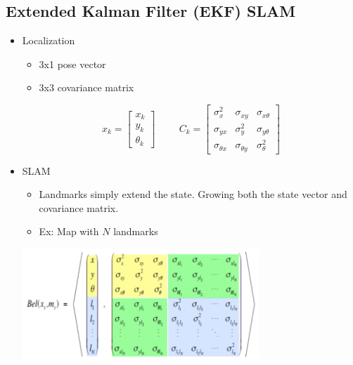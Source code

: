 \documentclass[10pt]{article}
\begin{document}
\subsection*{Extended Kalman Filter (EKF) SLAM}
\begin{itemize}
	\item Localization
	\begin{itemize}
        \item 3x1 pose vector
        \item 3x3 covariance matrix
    \end{itemize}
    \[x_k = \begin{bmatrix} x_k \\ y_k \\ \theta_k \end{bmatrix} \hspace{1cm} C_k = \begin{bmatrix} \sigma_x^2 & \sigma_{xy} & \sigma_{x\theta} \\ \sigma_{yx} & \sigma_y^2 & \sigma_{y\theta} \\ \sigma_{\theta x} & \sigma_{\theta y} & \sigma_{\theta}^2 \end{bmatrix}\]
    \item SLAM
    \begin{itemize}
        \item Landmarks simply extend the state.  Growing both the state vector and covariance matrix.
        \item Ex: Map with $N$ landmarks
    \end{itemize}
    \begin{center} 
        \includegraphics*[width=0.7\textwidth]{L2_11.png} 
    \end{center}
\end{itemize}

\pagebreak
\end{document}
